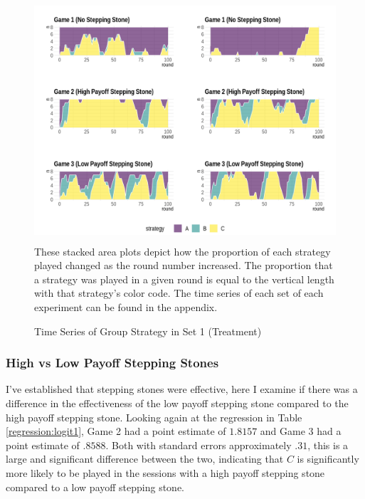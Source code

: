 \begin{figure}[H]
  \captionsetup{justification=centering}
  \caption[caption]{Time Series of Group Strategy in Set 1 (Treatment)}
  \label{fig:Set1}
  \includegraphics[width=\textwidth, height=340px]{Images/AllAreaPlotSet1_2.png}
  These stacked area plots depict how the proportion of each strategy played changed as the round number increased. The proportion that a strategy was played in a given round is equal to the vertical length with that strategy's color code. The time series of each set of each experiment can be found in the appendix. 
\end{figure}



\subsubsection*{High vs Low Payoff Stepping Stones}

I've established that stepping stones were effective, here I examine if there was a difference in the effectiveness of the low payoff stepping stone compared to the high payoff stepping stone. Looking again at the regression in Table \ref{regression:logit1}, Game 2 had a point estimate of $1.8157$ and Game 3 had a point estimate of $.8588$. Both with standard errors approximately $.31$, this is a large and significant difference between the two, indicating that $C$ is significantly more likely to be played in the sessions with a high payoff stepping stone compared to a low payoff stepping stone. 

